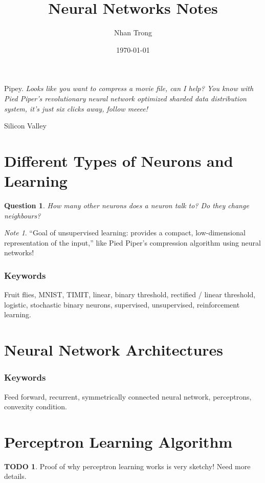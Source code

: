 \documentclass[12pt]{article}
\title{Neural Networks Notes}
\author{Nhan Trong}
\date{\today}                                           %
\theoremstyle{plain}
\newtheorem{question}[theorem]{Question}
\theoremstyle{definition}
\newtheorem{todo}{TODO}
\theoremstyle{remark}
\newtheorem{note}[theorem]{Note}
\begin{document}
\maketitle

\epigraph{Pipey. \textit{Looks like you want to compress a movie file, can I help? You know with Pied Piper's revolutionary neural network optimized sharded data distribution system, it's just six clicks away, follow meeee!}}{Silicon Valley}

\part{Different Types of Neurons and Learning}

\begin{question}
How many other neurons does a neuron talk to? Do they change neighbours?
\end{question}

\begin{note}
``Goal of unsupervised learning: provides a compact, low-dimensional representation of the input,'' like Pied Piper's compression algorithm using neural networks!
\end{note}

\section{Keywords}

Fruit flies, MNIST, TIMIT, linear, binary threshold, rectified / linear threshold, logistic, stochastic binary neurons, supervised, unsupervised, reinforcement learning.

\part{Neural Network Architectures}

\section{Keywords}

Feed forward, recurrent, symmetrically connected neural network, perceptrons, convexity condition.

\part{Perceptron Learning Algorithm}

\begin{todo}
Proof of why perceptron learning works is very sketchy! Need more details.
\end{todo}
\end{document}
